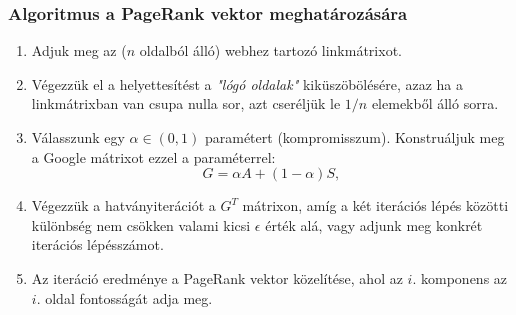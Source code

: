 \documentclass[]{beamer}
\begin{document}
\begin{frame}
	\frametitle{Algoritmus a PageRank vektor meghatározására}
	\begin{enumerate}
		\item Adjuk meg az ($n$ oldalból álló) webhez tartozó linkmátrixot.
		
		\item Végezzük el a helyettesítést a \textit{"lógó oldalak"} kiküszöbölésére, azaz ha a linkmátrixban van csupa nulla sor, azt cseréljük le $1/n$ elemekből álló sorra.
		
		\item Válasszunk egy $\alpha \in (0,1)$ paramétert (kompromisszum). Konstruáljuk meg a Google mátrixot ezzel a paraméterrel:
		\[G = \alpha A + (1-\alpha)S,\]
		
		\item Végezzük a hatványiterációt a $G^T$ mátrixon, amíg a két iterációs lépés közötti különbség nem csökken valami kicsi $\epsilon$ érték alá, vagy adjunk meg konkrét iterációs lépésszámot.
		
		\item Az iteráció eredménye a PageRank vektor közelítése, ahol az $i.$ komponens az $i.$ oldal fontosságát adja meg.
	\end{enumerate}
\end{frame}
\end{document}

